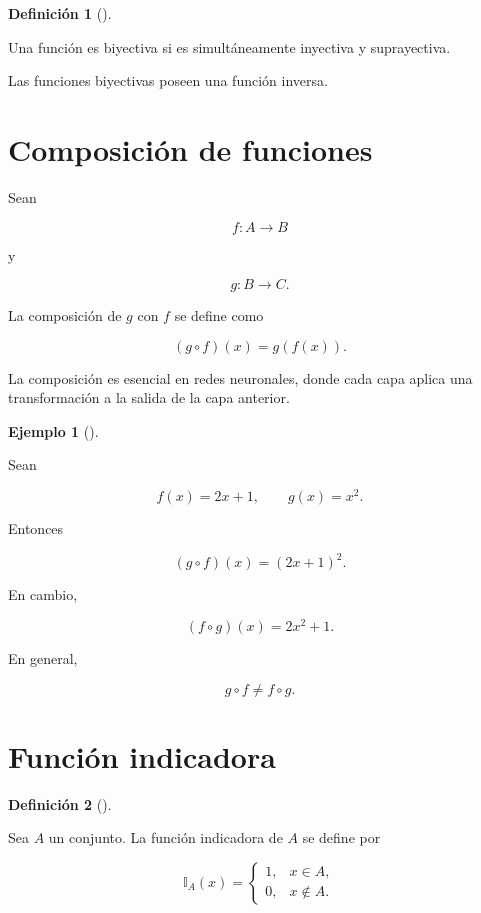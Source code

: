 \documentclass[
  spanish,
  11pt,
  letterpaper,
  DIV=11,
  numbers=noendperiod]{scrreprt}
\theoremstyle{definition}
\newtheorem{definition}{Definición}[chapter]
\theoremstyle{plain}
\theoremstyle{definition}
\newtheorem{example}{Ejemplo}[chapter]
\theoremstyle{remark}
\begin{document}
\begin{definition}[]\protect\hypertarget{def-biyectiva}{}\label{def-biyectiva}

Una función es biyectiva si es simultáneamente inyectiva y suprayectiva.

\end{definition}

Las funciones biyectivas poseen una función inversa.

\section{Composición de funciones}\label{composiciuxf3n-de-funciones}

Sean

\[
f:A\to B
\]

y

\[
g:B\to C.
\]

La composición de \(g\) con \(f\) se define como

\[
(g\circ f)(x)=g(f(x)).
\]

La composición es esencial en redes neuronales, donde cada capa aplica
una transformación a la salida de la capa anterior.

\begin{example}[]\protect\hypertarget{exm-composicion}{}\label{exm-composicion}

Sean

\[
f(x)=2x+1,
\qquad
g(x)=x^2.
\]

Entonces

\[
(g\circ f)(x)
=
(2x+1)^2.
\]

En cambio,

\[
(f\circ g)(x)
=
2x^2+1.
\]

En general,

\[
g\circ f\neq f\circ g.
\]

\end{example}

\section{Función indicadora}\label{funciuxf3n-indicadora}

\begin{definition}[]\protect\hypertarget{def-indicadora}{}\label{def-indicadora}

Sea \(A\) un conjunto. La función indicadora de \(A\) se define por

\[
\mathbb{I}_{A}(x)
=
\begin{cases}
1, & x\in A,\\
0, & x\notin A.
\end{cases}
\]

\end{definition}
\end{document}
